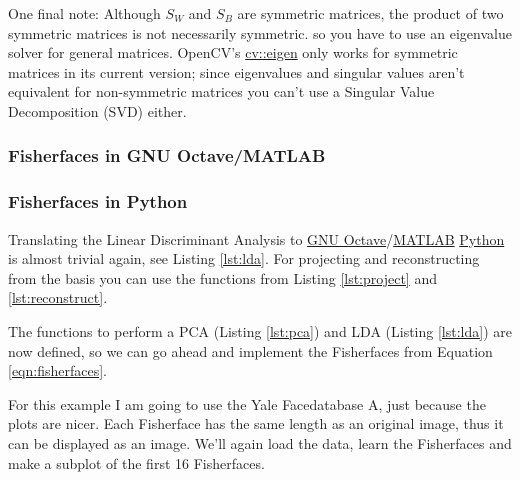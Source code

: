One final note: Although $S_{W}$ and $S_{B}$ are symmetric matrices, the product of two symmetric matrices is not necessarily symmetric. so you have to use an eigenvalue solver for general matrices. OpenCV's \href{http://opencv.willowgarage.com/documentation/cpp/operations_on_arrays.html#cv-eigen}{cv::eigen} only works for symmetric matrices in its current version; since eigenvalues and singular values aren't equivalent for non-symmetric matrices you can't use a Singular Value Decomposition (SVD) either.

\ifx\python\undefined 
	\subsubsection{Fisherfaces in GNU Octave/MATLAB}
\else
 \subsubsection{Fisherfaces in Python}
\fi

\label{ssection:example_fisherfaces}

Translating the Linear Discriminant Analysis to \ifx\python\undefined \href{http://www.gnu.org/software/octave/}{GNU Octave}/\href{http://www.mathworks.com}{MATLAB} \else \href{http://www.python.org}{Python} \fi is almost trivial again, see Listing \ref{lst:lda}. For projecting and reconstructing from the basis you can use the functions from Listing \ref{lst:project} and \ref{lst:reconstruct}.

\ifx\python\undefined
	
\else
		
\fi

The functions to perform a PCA (Listing \ref{lst:pca}) and LDA (Listing \ref{lst:lda}) are now defined, so we can go ahead and implement the Fisherfaces from Equation \ref{eqn:fisherfaces}. 

\ifx\python\undefined
	
\else
	
\fi

For this example I am going to use the Yale Facedatabase A, just because the plots are nicer. Each Fisherface has the same length as an original image, thus it can be displayed as an image. We'll again load the data, learn the Fisherfaces and make a subplot of the first 16 Fisherfaces.

